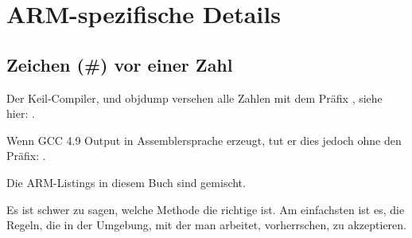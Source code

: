 \section{ARM-spezifische Details}

\subsection{Zeichen (\#) vor einer Zahl}
Der Keil-Compiler, \IDA und objdump versehen alle Zahlen mit dem Präfix \q{\#}, siehe hier:
.

Wenn GCC 4.9 Output in Assemblersprache erzeugt, tut er dies jedoch ohne den Präfix:
.

Die ARM-Listings in diesem Buch sind gemischt.

Es ist schwer zu sagen, welche Methode die richtige ist.
Am einfachsten ist es, die Regeln, die in der Umgebung, mit der man arbeitet, vorherrschen, zu akzeptieren.




